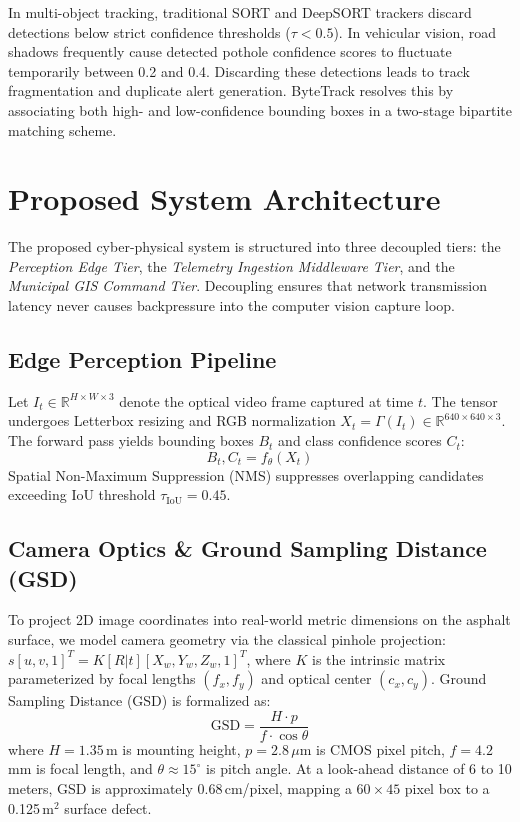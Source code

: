 \documentclass[conference]{IEEEtran}
\begin{document}
In multi-object tracking, traditional SORT \cite{sort} and DeepSORT \cite{deepsort} trackers discard detections below strict confidence thresholds ($\tau < 0.5$). In vehicular vision, road shadows frequently cause detected pothole confidence scores to fluctuate temporarily between 0.2 and 0.4. Discarding these detections leads to track fragmentation and duplicate alert generation. ByteTrack \cite{bytetrack} resolves this by associating both high- and low-confidence bounding boxes in a two-stage bipartite matching scheme.

\section{Proposed System Architecture}
The proposed cyber-physical system is structured into three decoupled tiers: the \textit{Perception Edge Tier}, the \textit{Telemetry Ingestion Middleware Tier}, and the \textit{Municipal GIS Command Tier}. Decoupling ensures that network transmission latency never causes backpressure into the computer vision capture loop.

\subsection{Edge Perception Pipeline}
Let $I_t \in \mathbb{R}^{H \times W \times 3}$ denote the optical video frame captured at time $t$. The tensor undergoes Letterbox resizing and RGB normalization $X_t = \Gamma(I_t) \in \mathbb{R}^{640 \times 640 \times 3}$. The forward pass yields bounding boxes $B_t$ and class confidence scores $C_t$:
\begin{equation}
B_t, C_t = f_\theta(X_t)
\end{equation}
Spatial Non-Maximum Suppression (NMS) suppresses overlapping candidates exceeding IoU threshold $\tau_{\text{IoU}} = 0.45$.

\subsection{Camera Optics \& Ground Sampling Distance (GSD)}
To project 2D image coordinates into real-world metric dimensions on the asphalt surface, we model camera geometry via the classical pinhole projection: $s [u, v, 1]^T = K [R | t] [X_w, Y_w, Z_w, 1]^T$, where $K$ is the intrinsic matrix parameterized by focal lengths $(f_x, f_y)$ and optical center $(c_x, c_y)$. Ground Sampling Distance (GSD) is formalized as:
\begin{equation}
\text{GSD} = \frac{H \cdot p}{f \cdot \cos\theta}
\end{equation}
where $H = 1.35$\,m is mounting height, $p = 2.8\,\mu\text{m}$ is CMOS pixel pitch, $f = 4.2$\,mm is focal length, and $\theta \approx 15^\circ$ is pitch angle. At a look-ahead distance of 6 to 10 meters, GSD is approximately 0.68\,cm/pixel, mapping a $60 \times 45$ pixel box to a 0.125\,m$^2$ surface defect.
\end{document}
